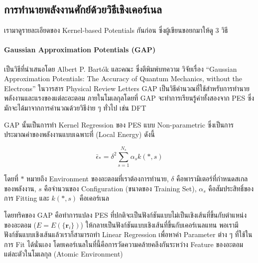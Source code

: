 \subsection{การทำนายพลังงานศักย์ด้วยวิธีเชิงเคอร์เนล}
\label{ssec:pred_pot_ener_kernel}

เรามาดูรายละเอียดของ Kernel-based Potentials กันก่อน ซึ่งผู้เขียนขอยกมาให้ดู 3 วิธี

\paragraph{Gaussian Approximation Potentials (GAP)} เป็นวิธีที่นำเสนอโดย Albert P. Bart\'{o}k และคณะ ซึ่งตีพิมพ์บทความ%
วิจัยเรื่อง \enquote{Gaussian Approximation Potentials: The Accuracy of Quantum Mechanics, without the Electrons} 
ในวารสาร Physical Review Letters\autocite{bartok2010} GAP เป็นวิธีคำนวณที่ใช้สำหรับการทำนายพลังงานและแรงของแต่ละอะตอม%
ภายในโมเลกุลโดยที่ GAP จะทำการเรียนรู้ค่าทั้งสองจาก PES ซึ่งมักจะได้มาจากการคำนวณด้วยวิธีง่าย ๆ ทั่วไป เช่น DFT 

GAP นั้นเป็นการทำ Kernel Regression ของ PES แบบ Non-parametric ซึ่งเป็นการประมาณค่าของพลังงานแบบเฉพาะที่ (Local Energy)
ดังนี้

\begin{equation}\label{eq:gap}
    \bar{\epsilon}_{\ast} = \delta^{2} \sum\limits_{s = 1}^{N_s} \alpha_{s} k(\ast,s)
\end{equation}

\noindent โดยที่ $\ast$ หมายถึง Environment ของอะตอมที่เราต้องการทำนาย, $\delta$ คือพารามิเตอร์ที่กำหนดสเกลของพลังงาน, 
$s$ คือจำนวนของ Configuration (ขนาดของ Training Set), $\alpha_{s}$ คือสัมประสิทธิ์ของการ Fitting และ $k(\ast,s)$ 
คือเคอร์เนล

โดยทริคของ GAP คือทำการแปลง PES ที่ปกติจะเป็นฟังก์ชันแบบไม่เป็นเชิงเส้นที่ขึ้นกับตำแหน่งของอะตอม ($E = E(\{ \textbf{r}_i \})$) 
ให้กลายเป็นฟังก์ชันแบบเชิงเส้นที่ขึ้นกับเคอร์เนลแทน พอเรามีฟังก์ชันแบบเชิงเส้นแล้วเราก็สามารถทำ Linear Regression เพื่อหาค่า Parameter 
ต่าง ๆ ที่ใช้ในการ Fit ได้นั่นเอง โดยเคอร์เนลในที่นี้คือการวัดความคล้ายคลึงกันระหว่าง Feature ของอะตอมแต่ละตัวในโมเลกุล (Atomic 
Environment)

